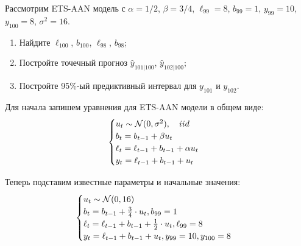 \begin{problem}
  Рассмотрим ETS-AAN модель с $\alpha = 1/2$, $\beta=3/4$, $\ell_{99}=8$, $b_{99}=1$, $y_{99}=10$, $y_{100}=8$, $\sigma^2=16$.
  \begin{enumerate}
    \item Найдите $\ell_{100}$, $b_{100}$, $\ell_{98}$, $b_{98}$;
    \item Постройте точечный прогноз $\hat y_{101|100}$, $\hat y_{102|100}$;
    \item Постройте 95\%-ый предиктивный интервал для $y_{101}$ и $y_{102}$.
  \end{enumerate}
\begin{sol}
  Для начала запишем уравнения для ETS-AAN модели в общем виде:
  \[
    \begin{cases}
          u_t \sim \mathcal{N} (0, \sigma^2), \quad iid \\
          b_t = b_{t-1} + \beta u_t \\
          \ell_t = \ell_{t-1} + b_{t-1} + \alpha u_t \\
          y_t = \ell_{t-1} + b_{t-1} + u_t
    \end{cases}
  \]
  
  Теперь подставим известные параметры и начальные значения:
  \[
      \begin{cases}
          u_t \sim \mathcal{N} (0, 16)   \\
          b_t = b_{t-1} + \frac{3}{4} \cdot u_t,  b_{99}=1 \\
          \ell_t = \ell_{t-1} + b_{t-1} + \frac{1}{2} \cdot u_t, \ell_{99}=8 \\
          y_t = \ell_{t-1} + b_{t-1} + u_t,  y_{99}=10,  y_{100}=8
      \end{cases}
  \]
  

\end{sol}
\end{problem}
